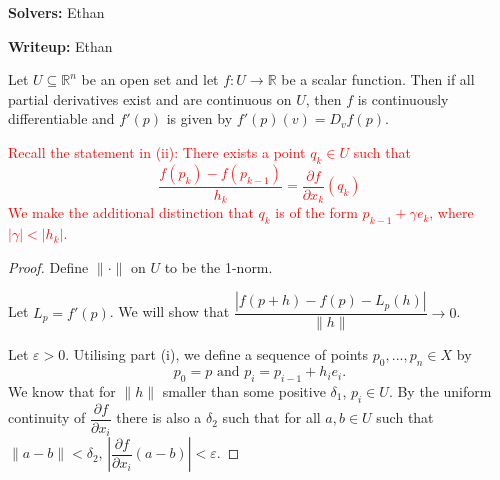 \documentclass{article}
\theoremstyle{plain} %
\numberwithin{thm}{section} %
\theoremstyle{definition}
\begin{document}
    \textbf{Solvers:} Ethan

    \noindent\textbf{Writeup:} Ethan

    Let \(U \subseteq \mathbb{R}^n\) be an open set and let \(f: U \to \mathbb{R}\) be a scalar function. Then if all partial derivatives exist and are continuous on \(U\), then \(f\) is continuously differentiable and \(f'(p)\) is given by \(f'(p)(v) = D_v f(p)\).

    \textcolor{red}{Recall the statement in (ii): There exists a point \(q_k \in U\) such that
    \[
        \frac{f(p_k) - f(p_{k-1})}{h_k} = \frac{\partial f}{\partial x_k} (q_k)
    \]
    We make the additional distinction that \(q_k\) is of the form \(p_{k-1} + \gamma e_k\), where \(|\gamma| < |h_k|\).}

    \begin{proof}
        Define \(\|\cdot\|\) on \(U\) to be the 1-norm.

        Let \(L_p = f'(p)\). We will show that \(\dfrac{|f(p+h) - f(p) - L_p(h)|}{\|h\|} \to 0\).

        Let \(\varepsilon > 0\). Utilising part (i), we define a sequence of points \(p_0, ..., p_n \in X\) by
        \[
            p_0 = p \text{ and } p_i = p_{i-1} + h_i e_i \text{.} 
        \]
        We know that for \(\|h\|\) smaller than some positive \(\delta _1\), \(p_i \in U\). By the uniform continuity of \(\dfrac{\partial f}{\partial x_i}\) there is also a \(\delta _2\) such that for all \(a,b \in U\) such that \(\|a-b\| <\delta _2\), \(\left\vert\dfrac{\partial f}{\partial x_i} (a-b)\right\vert < \varepsilon\).


\end{proof}
\end{document}
